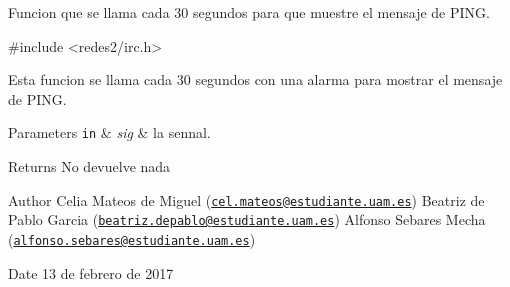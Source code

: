 Funcion que se llama cada 30 segundos para que muestre el mensaje de P\+I\+N\+G.


\begin{DoxyCode}
\textcolor{preprocessor}{#include <redes2/irc.h>}
\end{DoxyCode}


Esta funcion se llama cada 30 segundos con una alarma para mostrar el mensaje de P\+I\+N\+G.


\begin{DoxyParams}[1]{Parameters}
\mbox{\tt in}  & {\em sig} & la sennal.\\
\hline
\end{DoxyParams}
\begin{DoxyReturn}{Returns}
No devuelve nada
\end{DoxyReturn}
\begin{DoxyAuthor}{Author}
Celia Mateos de Miguel (\href{mailto:cel.mateos@estudiante.uam.es}{\tt cel.\+mateos@estudiante.\+uam.\+es}) Beatriz de Pablo Garcia (\href{mailto:beatriz.depablo@estudiante.uam.es}{\tt beatriz.\+depablo@estudiante.\+uam.\+es}) Alfonso Sebares Mecha (\href{mailto:alfonso.sebares@estudiante.uam.es}{\tt alfonso.\+sebares@estudiante.\+uam.\+es})
\end{DoxyAuthor}
\begin{DoxyDate}{Date}
13 de febrero de 2017
\end{DoxyDate}


 